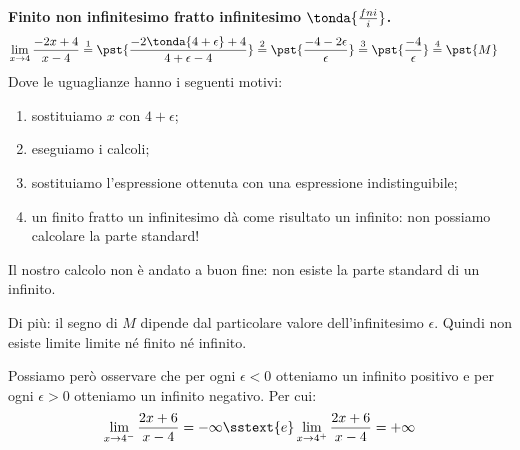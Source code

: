 \begin{esempio}
\textbf{Finito non infinitesimo fratto infinitesimo 
\(\tonda{\frac{fni}{i}}\).}
\begin{align*}
\lim_{x \rightarrow 4} \frac{-2x+4}{x-4} & \stackrel{1}{=} 
  \pst{\frac{-2\tonda{4+\epsilon}+4}{4+\epsilon-4}} \stackrel{2}{=}  
  \pst{\frac{-4 - 2 \epsilon}{\epsilon}} \stackrel{3}{=} 
  \pst{\frac{-4}{\epsilon}} \stackrel{4}{=} 
  \pst{M} %
\end{align*}
Dove le uguaglianze hanno i seguenti motivi:
\begin{enumerate} [nosep]
 \item sostituiamo \(x\) con \(4+\epsilon\);
 \item eseguiamo i calcoli;
 \item sostituiamo l'espressione ottenuta con una espressione 
   indistinguibile;
 \item un finito fratto un infinitesimo dà come risultato un infinito: 
 non possiamo calcolare la parte standard!
\end{enumerate}
Il nostro calcolo non è andato a buon fine: non esiste la parte standard di 
un infinito.

Di più: il segno di \(M\) dipende dal particolare valore dell'infinitesimo 
\(\epsilon\). Quindi non esiste limite limite né finito né infinito.

Possiamo però osservare che per ogni \(\epsilon < 0\) otteniamo un infinito 
positivo e per ogni \(\epsilon > 0\) otteniamo un infinito 
negativo. Per cui:
\[\lim_{x \rightarrow 4^-} \frac{2x+6}{x-4}= -\infty \sstext{e}
\lim_{x \rightarrow 4^+} \frac{2x+6}{x-4}= +\infty\]
\end{esempio}

